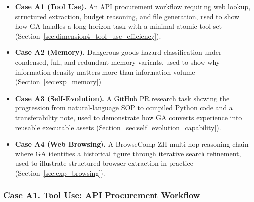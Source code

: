 \begin{itemize}[leftmargin=*]
\item \textbf{Case A1 (Tool Use).} An API procurement workflow requiring web lookup, structured extraction, budget reasoning, and file generation, used to show how GA handles a long-horizon task with a minimal atomic-tool set (Section~\ref{sec:dimension4_tool_use_efficiency}).

\item \textbf{Case A2 (Memory).} Dangerous-goods hazard classification under condensed, full, and redundant memory variants, used to show why information density matters more than information volume (Section~\ref{sec:exp_memory}).

\item \textbf{Case A3 (Self-Evolution).} A GitHub PR research task showing the progression from natural-language SOP to compiled Python code and a transferability note, used to demonstrate how GA converts experience into reusable executable assets (Section~\ref{sec:self_evolution_capability}).

\item \textbf{Case A4 (Web Browsing).} A BrowseComp-ZH multi-hop reasoning chain where GA identifies a historical figure through iterative search refinement, used to illustrate structured browser extraction in practice (Section~\ref{sec:exp_browsing}).
\end{itemize}

\subsubsection{Case A1. Tool Use: API Procurement Workflow}
\label{app:case_tools}


